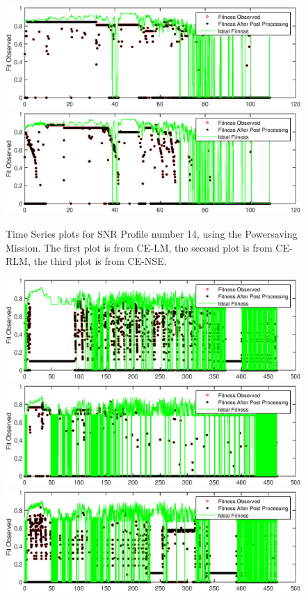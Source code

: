 \begin{appendices}
\begin{figure}[ht!]
\includegraphics{figures/c_sim_timeSeries/Fitness_timeSeries_RLM_14.eps}
\includegraphics{figures/c_sim_timeSeries/Fitness_timeSeries_NSE_14.eps}
\caption{Time Series plots for SNR Profile number 14, using the Powersaving Mission. The first plot is from CE-LM, the second plot is from CE-RLM, the third plot is from CE-NSE.}
\end{figure}
\begin{figure}[ht!]
\includegraphics{figures/c_sim_timeSeries/Fitness_timeSeries_LM_15.eps}
\includegraphics{figures/c_sim_timeSeries/Fitness_timeSeries_RLM_15.eps}
\includegraphics{figures/c_sim_timeSeries/Fitness_timeSeries_NSE_15.eps}

\end{figure}
\end{appendices}
